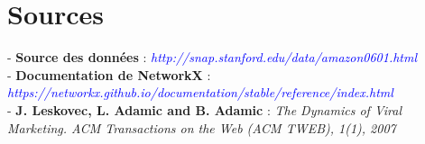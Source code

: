 \documentclass[14pt, openany]{article}
\begin{document}
\section{Sources}
\begin{flushleft}
- \textbf{Source des données} : \textit{\textcolor{blue}{http://snap.stanford.edu/data/amazon0601.html}}\\
\medskip
- \textbf{Documentation de NetworkX} : \textit{\textcolor{blue}{https://networkx.github.io/documentation/stable/reference/index.html}}\\
\medskip
- \textbf{J. Leskovec, L. Adamic and B. Adamic} : \textit{The Dynamics of Viral Marketing. ACM Transactions on the Web (ACM TWEB), 1(1), 2007}
\end{flushleft}
\end{document}
